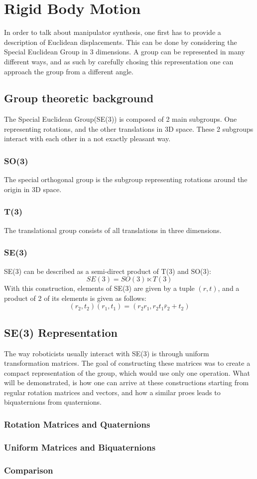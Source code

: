\chapter{Rigid Body Motion}
In order to talk about manipulator synthesis, one first has to provide a
description of Euclidean displacements. This can be done by considering the Special Euclidean Group in 3 dimensions. A group can be represented in many different ways, and as such by carefully chosing this representation one can approach the group from a different angle.
\section{Group theoretic background}
The Special Euclidean Group(SE(3)) is composed of 2 main subgroups. One
representing rotations, and the other translations in 3D space. These 2 subgroups interact with each other in a not exactly pleasant way.
\subsection{SO(3)}
The special orthogonal group is the subgroup representing rotations around the origin in 3D space.
\subsection{T(3)}
The translational group consists of all translations in three dimensions.
\subsection{SE(3)}
SE(3) can be described as a semi-direct product of T(3) and SO(3):
\begin{equation}
    SE(3) = SO(3)\ltimes T(3)
\end{equation}
With this construction, elements of SE(3) are given by a tuple  $(r,t)$, and a product of 2 of its elements is given as follows:
 \begin{equation}
     \label{semidirect}
     (r_2,t_2)(r_1,t_1) = (r_2r_1,r_2t_1\bar{r}_2+t_2)
\end{equation}

\section{SE(3) Representation}
The way roboticists usually interact with SE(3) is through uniform
transformation matrices. The goal of constructing these matrices was to create a compact representation of the group, which would use only one operation.
What will be demonstrated, is how one can arrive at these constructions starting from regular rotation matrices and vectors, and how a similar proes leads to biquaternions from quaternions. 
\subsection{Rotation Matrices and Quaternions}

\subsection{Uniform Matrices and Biquaternions}
\subsection{Comparison}










